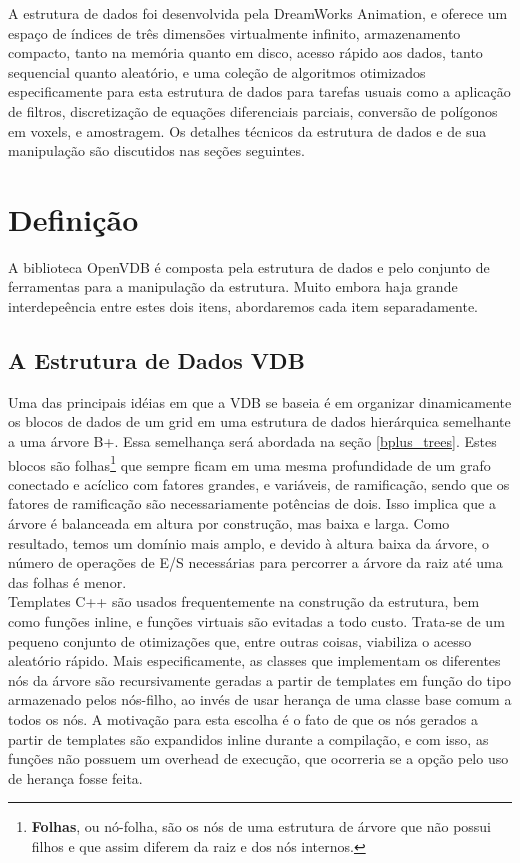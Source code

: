 \documentclass[12pt, a4paper, oneside]{book}
\begin{document}
A estrutura de dados foi desenvolvida pela DreamWorks Animation, e oferece um espaço de índices de três dimensões virtualmente infinito, armazenamento compacto, tanto na memória quanto em disco, acesso rápido aos dados, tanto sequencial quanto aleatório, e uma coleção de algoritmos otimizados especificamente para esta estrutura de dados para tarefas usuais como a aplicação de filtros, discretização de equações diferenciais parciais, conversão de polígonos em voxels, e amostragem. Os detalhes técnicos da estrutura de dados e de sua manipulação são discutidos nas seções seguintes.

\section{Definição}
A biblioteca OpenVDB é composta pela estrutura de dados e pelo conjunto de ferramentas para a manipulação da estrutura. Muito embora haja grande interdepeência entre estes dois itens, abordaremos cada item separadamente.

\subsection{A Estrutura de Dados VDB}
\label{vdb_data}

Uma das principais idéias em que a VDB se baseia é em organizar dinamicamente os blocos de dados de um grid em uma estrutura de dados hierárquica semelhante a uma árvore B+. Essa semelhança será abordada na seção \ref{bplus_trees}. Estes blocos são folhas\footnote{{\bf Folhas}, ou nó-folha, são os nós de uma estrutura de árvore que não possui filhos e que assim diferem da raiz e dos nós internos.} que sempre ficam em uma mesma profundidade de um grafo conectado e acíclico com fatores grandes, e variáveis, de ramificação, sendo que os fatores de ramificação são necessariamente potências de dois. Isso implica que a árvore é balanceada em altura por construção, mas baixa e larga. Como resultado, temos um domínio mais amplo, e devido à altura baixa da árvore, o número de operações de E/S necessárias para percorrer a árvore da raiz até uma das folhas é menor. \\

Templates C++ são usados frequentemente na construção da estrutura, bem como funções inline, e funções virtuais são evitadas a todo custo. Trata-se de um pequeno conjunto de otimizações que, entre outras coisas, viabiliza o acesso aleatório rápido. Mais especificamente, as classes que implementam os diferentes nós da árvore são recursivamente geradas a partir de templates em função do tipo armazenado pelos nós-filho, ao invés de usar herança de uma classe base comum a todos os nós. A motivação para esta escolha é o fato de que os nós gerados a partir de templates são expandidos inline durante a compilação, e com isso, as funções não possuem um overhead de execução, que ocorreria se a opção pelo uso de herança fosse feita.
\end{document}
